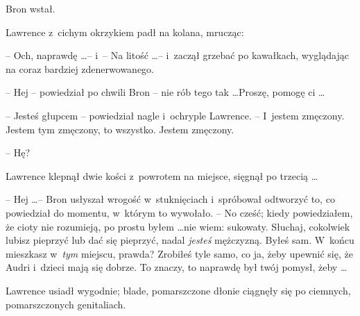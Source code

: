 \documentclass[oneside,polish,11pt,rmheadings]{mwbk}
\begin{document}
Bron wstał. 

Lawrence z~cichym okrzykiem padł na kolana, mrucząc:

 -- Och, naprawdę \ldots  -- i~-- Na litość \ldots  -- i~zaczął grzebać po kawałkach, wyglądając na coraz bardziej zdenerwowanego. 

-- Hej -- powiedział po chwili Bron -- nie rób tego tak \ldots   Proszę, pomogę ci \ldots  

-- Jesteś głupcem -- powiedział nagle i~ochryple Lawrence. -- I~jestem zmęczony. Jestem tym zmęczony, to wszystko. Jestem zmęczony. 

-- Hę? 

Lawrence klepnął dwie kości z~powrotem na miejsce, sięgnął po trzecią \ldots  

-- Hej \ldots  -- Bron usłyszał wrogość w~stuknięciach i~spróbował odtworzyć to, co powiedział do momentu, w~którym to wywołało. -- No cześć; kiedy powiedziałem, że cioty nie rozumieją, po prostu byłem \ldots  nie wiem: sukowaty. Słuchaj, cokolwiek lubisz pieprzyć lub dać się pieprzyć, nadal \textit{jesteś }mężczyzną. Byłeś sam.  W~końcu mieszkasz w~\textit{tym }miejscu, prawda?   Zrobiłeś tyle samo, co ja, żeby upewnić się, że Audri i~dzieci mają się dobrze. To znaczy, to naprawdę był twój pomysł, żeby \ldots  

Lawrence usiadł wygodnie; blade, pomarszczone dłonie ciągnęły się po ciemnych, pomarszczonych genitaliach. 
\end{document}
